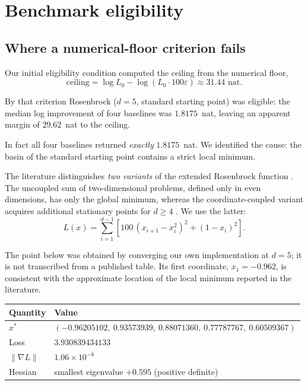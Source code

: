 \section{Benchmark eligibility}
\label{sec:eligibility}

\subsection{Where a numerical-floor criterion fails}

Our initial eligibility condition computed the ceiling from the numerical floor,
\begin{equation}
  \text{ceiling} = \log L_0 - \log\!\left(L_0 \cdot 100\varepsilon\right)
  \approx 31.44 \text{ nat} .
\end{equation}

By that criterion Rosenbrock ($d = 5$, standard starting point) was eligible: the
median log improvement of four baselines was $1.8175$~nat, leaving an apparent
margin of $29.62$~nat to the ceiling.

In fact all four baselines returned \emph{exactly} $1.8175$~nat. We identified the
cause: the basin of the standard starting point contains a strict local minimum.

The literature distinguishes \emph{two variants} of the extended Rosenbrock
function \citep{kok2009rosenbrock}. The uncoupled sum of two-dimensional problems,
defined only in even dimensions, has only the global minimum, whereas the
coordinate-coupled variant acquires additional stationary points for $d \geq 4$
\citep{shang2006rosenbrock,kok2009rosenbrock}. We use the latter:
\begin{equation}
  L(x) = \sum_{i=1}^{d-1}
    \left[ 100\,(x_{i+1} - x_i^2)^2 + (1 - x_i)^2 \right].
  \label{eq:rosenbrock}
\end{equation}

The point below was obtained by converging our own implementation at $d = 5$; it
is not transcribed from a published table. Its first coordinate,
$x_1 = -0.962$, is consistent with the approximate location of the local minimum
reported in the literature.

\begin{center}
\begin{tabular}{ll}
\toprule
Quantity & Value \\
\midrule
$x^\ast$ & $(-0.96205102,\ 0.93573939,\ 0.88071360,\ 0.77787767,\ 0.60509367)$ \\
Loss & $3.930839434133$ \\
$\lVert \nabla L \rVert$ & $1.06 \times 10^{-8}$ \\
Hessian & smallest eigenvalue $+0.595$ (positive definite) \\
\bottomrule
\end{tabular}
\end{center}

